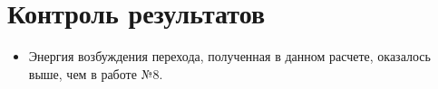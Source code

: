 \section{Контроль результатов}
\begin{itemize}
    \item Энергия возбуждения перехода, полученная в данном расчете, оказалось выше, чем в работе №8.
\end{itemize}{}